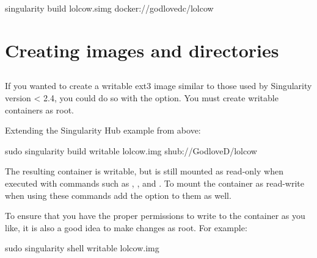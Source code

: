 \documentclass[letterpaper,10pt,english]{sphinxmanual}
\begin{document}
%
\begin{sphinxVerbatim}[commandchars=\\\{\}]
\PYGZdl{} singularity build lolcow.simg docker://godlovedc/lolcow
\end{sphinxVerbatim}


\section{Creating  images and  directories}
\label{\detokenize{build_a_container:creating-writable-images-and-sandbox-directories}}

\subsection{}
\label{\detokenize{build_a_container:writable}}
If you wanted to create a writable ext3 image similar to those used by
Singularity version \textless{} 2.4, you could do so with the  option. You must
create writable containers as root.

Extending the Singularity Hub example from above:

%
\begin{sphinxVerbatim}[commandchars=\\\{\}]
\PYGZdl{} sudo singularity build \PYGZhy{}\PYGZhy{}writable lolcow.img shub://GodloveD/lolcow
\end{sphinxVerbatim}

The resulting container is writable, but is still mounted as read-only
when executed with commands such as , , and . To mount the container
as read-write when using these commands add the  option to them as
well.

To ensure that you have the proper permissions to write to the
container as you like, it is also a good idea to make changes as root.
For example:

%
\begin{sphinxVerbatim}[commandchars=\\\{\}]
\PYGZdl{} sudo singularity shell \PYGZhy{}\PYGZhy{}writable lolcow.img
\end{sphinxVerbatim}
\end{document}

